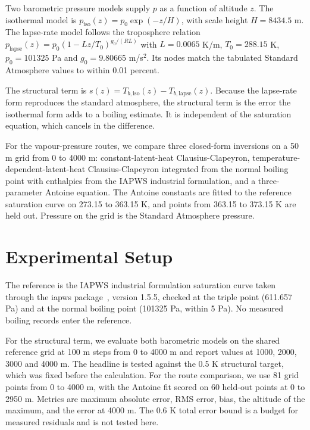 \documentclass[11pt,letterpaper]{article}
\begin{document}
Two barometric pressure models supply $p$ as a function of altitude $z$. The isothermal model is $p_{\mathrm{iso}}(z) = p_0 \exp(-z/H)$, with scale height $H = 8434.5$ m. The lapse-rate model follows the troposphere relation $p_{\mathrm{lapse}}(z) = p_0 (1 - L z / T_0)^{g_0 / (R L)}$ with $L = 0.0065$ K/m, $T_0 = 288.15$ K, $p_0 = 101325$ Pa and $g_0 = 9.80665$ m/s$^2$. Its nodes match the tabulated Standard Atmosphere values to within 0.01 percent.

The structural term is $s(z) = T_{b,\mathrm{iso}}(z) - T_{b,\mathrm{lapse}}(z)$. Because the lapse-rate form reproduces the standard atmosphere, the structural term is the error the isothermal form adds to a boiling estimate. It is independent of the saturation equation, which cancels in the difference.

For the vapour-pressure routes, we compare three closed-form inversions on a 50 m grid from 0 to 4000 m: constant-latent-heat Clausius-Clapeyron, temperature-dependent-latent-heat Clausius-Clapeyron integrated from the normal boiling point with enthalpies from the IAPWS industrial formulation, and a three-parameter Antoine equation. The Antoine constants are fitted to the reference saturation curve on 273.15 to 363.15 K, and points from 363.15 to 373.15 K are held out. Pressure on the grid is the Standard Atmosphere pressure.

\section{Experimental Setup}\label{sec:setup}

The reference is the IAPWS industrial formulation saturation curve taken through the iapws package~\citep{iapws}, version 1.5.5, checked at the triple point (611.657 Pa) and at the normal boiling point (101325 Pa, within 5 Pa). No measured boiling records enter the reference.

For the structural term, we evaluate both barometric models on the shared reference grid at 100 m steps from 0 to 4000 m and report values at 1000, 2000, 3000 and 4000 m. The headline is tested against the 0.5 K structural target, which was fixed before the calculation. For the route comparison, we use 81 grid points from 0 to 4000 m, with the Antoine fit scored on 60 held-out points at 0 to 2950 m. Metrics are maximum absolute error, RMS error, bias, the altitude of the maximum, and the error at 4000 m. The 0.6 K total error bound is a budget for measured residuals and is not tested here.
\end{document}

